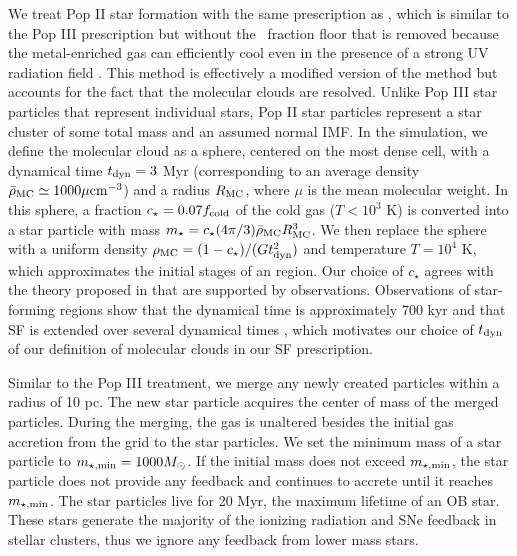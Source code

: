 \documentclass[apjl]{emulateapj}
\begin{document}
%

We treat Pop II star formation with the same prescription as
\citet{Wise09}, which is similar to the Pop III prescription but
without the \hh~fraction floor that is removed because the
metal-enriched gas can efficiently cool even in the presence of a
strong UV radiation field \citep[e.g.][]{Safranek10}.  This method is
effectively a modified version of the \citet{Cen92} method but
accounts for the fact that the molecular clouds are resolved.  Unlike
Pop III star particles that represent individual stars, Pop II star
particles represent a star cluster of some total mass and an assumed
normal IMF.  In the simulation, we define the molecular cloud as a
sphere, centered on the most dense cell, with a dynamical time $t_{\rm
  dyn} = 3$ Myr (corresponding to an average density $\bar{\rho}_{\rm
  MC} \simeq 1000\mu \cubecm$) and a radius $R_{\rm MC}$, where $\mu$
is the mean molecular weight.  In this sphere, a fraction $c_\star =
0.07 f_{\rm cold}$ of the cold gas ($T < 10^3$ K) is converted into a
star particle with mass $m_\star = c_\star (4\pi/3) \bar{\rho}_{\rm
  MC} R_{\rm MC}^3$.  We then replace the sphere with a uniform
density $\rho_{\rm MC} = (1 - c_\star) / (Gt_{\rm dyn}^2)$ and
temperature $T = 10^4$ K, which approximates the initial stages of an
 region.  Our choice of $c_\star$ agrees with the theory
proposed in \citet{Krumholz05} that are supported by observations.
Observations of star-forming regions show that the dynamical time is
approximately 700 kyr and that SF is extended over several dynamical
times \citep[e.g.][]{Tan06}, which motivates our choice of $t_{\rm
  dyn}$ of our definition of molecular clouds in our SF prescription.

Similar to the Pop III treatment, we merge any newly created particles
within a radius of 10 pc.  The new star particle acquires the center
of mass of the merged particles.  During the merging, the gas is
unaltered besides the initial gas accretion from the grid to the star
particles.  We set the minimum mass of a star particle to $m_{\rm
  \star, min} = 1000 \Ms$.  If the initial mass does not exceed
$m_{\rm \star, min}$, the star particle does not provide any feedback
and continues to accrete until it reaches $m_{\rm \star, min}$.  The
star particles live for 20 Myr, the maximum lifetime of an OB star.
These stars generate the majority of the ionizing radiation and SNe
feedback in stellar clusters, thus we ignore any feedback from lower
mass stars.
\end{document}
